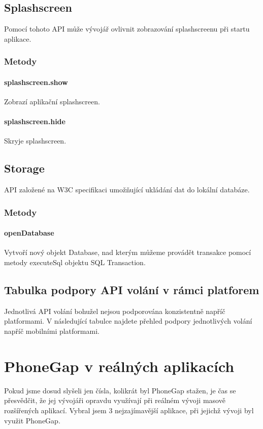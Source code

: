 \subsection{Splashscreen}
Pomocí tohoto API může vývojář ovlivnit zobrazování splashscreenu při startu aplikace.

\subsubsection{Metody}
\paragraph{splashscreen.show}
Zobrazí aplikační splashscreen.

\paragraph{splashscreen.hide}
Skryje splashscreen.

\subsection{Storage}
API založené na W3C specifikaci umožňující ukládání dat do lokální databáze.

\subsubsection{Metody}
\paragraph{openDatabase}
Vytvoří nový objekt Database, nad kterým můžeme provádět transakce pomocí metody executeSql objektu SQL Transaction.

\subsection{Tabulka podpory API volání v rámci platforem}
Jednotlivá API volání bohužel nejsou podporována konzistentně napříč platformami. V následující tabulce najdete přehled podpory jednotlivých volání napříč mobilními platformami.

\section{PhoneGap v reálných aplikacích}
Pokud jsme dosud slyšeli jen čísla, kolikrát byl PhoneGap stažen, je čas se přesvědčit, že jej vývojáři opravdu využívají při reálném vývoji masově rozšířených aplikací. Vybral jsem 3 nejzajímavější aplikace, při jejichž vývoji byl využit PhoneGap.

